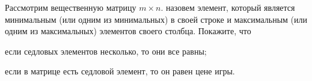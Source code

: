 Рассмотрим вещественную матрицу $m \times n$.  назовем элемент,
который является минимальным (или одним из минимальных) в своей строке и максимальным (или одним из
максимальных) элементов своего столбца. Покажите, что
\begin{enumcyr}
    \item если седловых элементов несколько, то они все равны;
    \item если в матрице есть седловой элемент, то он равен цене игры.
\end{enumcyr}